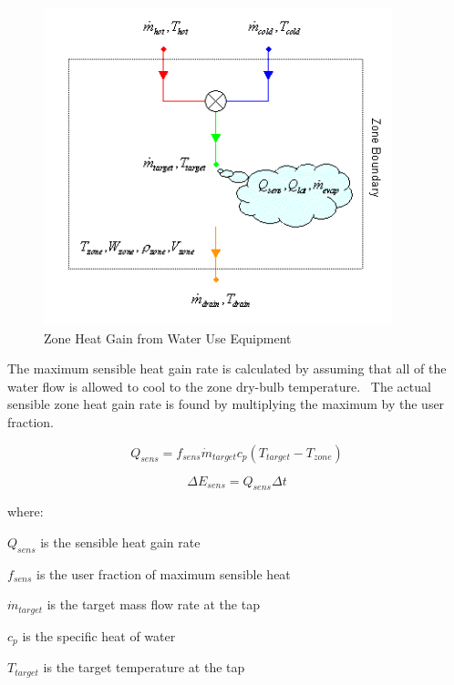 \begin{figure}[hbtp] %
\centering
\includegraphics[width=0.9\textwidth, height=0.9\textheight, keepaspectratio=true]{media/image6962.png}
\caption{Zone Heat Gain from Water Use Equipment \protect \label{fig:zone-heat-gain-from-water-use-equipment}}
\end{figure}

The maximum sensible heat gain rate is calculated by assuming that all of the water flow is allowed to cool to the zone dry-bulb temperature.~ The actual sensible zone heat gain rate is found by multiplying the maximum by the user fraction.

\begin{equation}
{Q_{sens}} = {f_{sens}}{\dot m_{target}}{c_p}\left( {{T_{target}} - {T_{zone}}} \right)
\end{equation}

\begin{equation}
\Delta {E_{sens}} = {Q_{sens}}\Delta t
\end{equation}

where:

\({Q_{sens}}\) is the sensible heat gain rate

\({f_{sens}}\) is the user fraction of maximum sensible heat

\({\dot m_{target}}\) is the target mass flow rate at the tap

\({c_p}\) is the specific heat of water

\({T_{target}}\) is the target temperature at the tap


